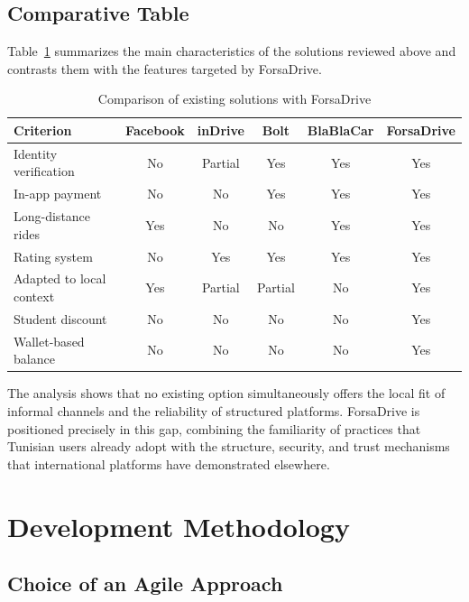 \subsection{Comparative Table}

Table~\ref{tab:comparison_existing} summarizes the main characteristics of the solutions reviewed above and contrasts them with the features targeted by ForsaDrive.

\begin{table}[H]
\centering
\caption{Comparison of existing solutions with ForsaDrive}
\label{tab:comparison_existing}
\begin{tabular}{|l|c|c|c|c|c|}
\hline
\textbf{Criterion}       & \textbf{Facebook} & \textbf{inDrive} & \textbf{Bolt} & \textbf{BlaBlaCar} & \textbf{ForsaDrive} \\
\hline
Identity verification    & No  & Partial & Yes & Yes & Yes \\
\hline
In-app payment           & No  & No      & Yes & Yes & Yes \\
\hline
Long-distance rides      & Yes & No      & No  & Yes & Yes \\
\hline
Rating system            & No  & Yes     & Yes & Yes & Yes \\
\hline
Adapted to local context & Yes & Partial & Partial & No & Yes \\
\hline
Student discount         & No  & No      & No  & No & Yes \\
\hline
Wallet-based balance     & No  & No      & No  & No & Yes \\
\hline
\end{tabular}
\end{table}

The analysis shows that no existing option simultaneously offers the local fit of informal channels and the reliability of structured platforms. ForsaDrive is positioned precisely in this gap, combining the familiarity of practices that Tunisian users already adopt with the structure, security, and trust mechanisms that international platforms have demonstrated elsewhere.


\section{Development Methodology}

\subsection{Choice of an Agile Approach}

